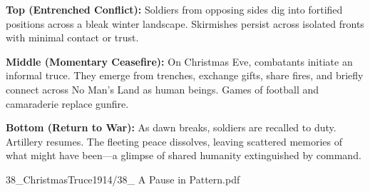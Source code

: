 \begin{SideNotePage}{
  \textbf{Top (Entrenched Conflict):} Soldiers from opposing sides dig into fortified positions across a bleak winter landscape. Skirmishes persist across isolated fronts with minimal contact or trust. \par

  \textbf{Middle (Momentary Ceasefire):} On Christmas Eve, combatants initiate an informal truce. They emerge from trenches, exchange gifts, share fires, and briefly connect across No Man’s Land as human beings. Games of football and camaraderie replace gunfire. \par

  \textbf{Bottom (Return to War):} As dawn breaks, soldiers are recalled to duty. Artillery resumes. The fleeting peace dissolves, leaving scattered memories of what might have been—a glimpse of shared humanity extinguished by command. \par
}{38_ChristmasTruce1914/38_ A Pause in Pattern.pdf}
\end{SideNotePage}
